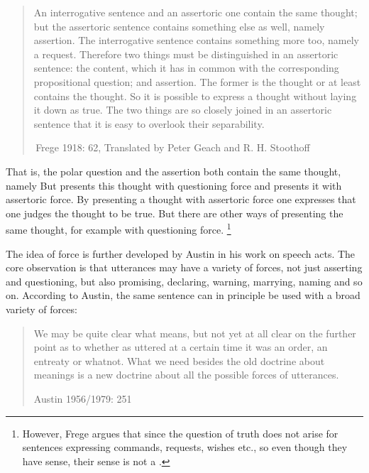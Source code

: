 \begin{quote}
    

An interrogative sentence and an assertoric one contain the same thought; but the assertoric sentence contains something else as well, namely assertion. The interrogative sentence contains something more too, namely a request. Therefore two things must be distinguished in an assertoric sentence: the content, which it has in common with the corresponding propositional question; and assertion. The former is the thought or at least contains the thought. So it is possible to express a thought without laying it down as true. The two things are so closely joined in an assertoric sentence that it is easy to overlook their separability. 

$\,$\hfill Frege 1918: 62, Translated by Peter Geach and R. H. Stoothoff
\end{quote}

That is, the polar question  and the assertion  both contain the same thought, namely   But  presents this thought with questioning force and  presents it with assertoric force. By presenting a thought with assertoric force one expresses that one judges the thought to be true. But there are other ways of presenting the same thought, for example with questioning force. \footnote{However, Frege argues that since the question of truth does not arise for sentences expressing commands, requests, wishes etc., so even though they have sense, their sense is not a .}

The idea of force is further developed by Austin in his work on speech acts. The core observation is that utterances may have a variety of forces, not just asserting and questioning, but also promising, declaring, warning, marrying, naming and so on. According to Austin, the same sentence can in principle be used with a broad variety of forces:

\begin{quote}
    
We may be quite clear what  means, but not yet at all clear on the further point as to whether as uttered at a certain time it was an order, an entreaty or whatnot. What we need besides the old doctrine about meanings is a new doctrine about all the possible forces of utterances.

\hfill Austin 1956/1979: 251
\end{quote}


